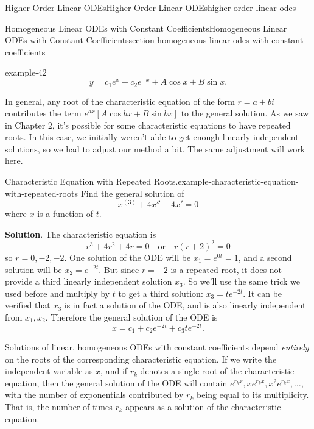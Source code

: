 \documentclass[oneside,10pt,]{book}
\numberwithin{equation}{section}
\newcommand{\brackets}[1]{\left[ #1 \right]}
\begin{document}
\begin{chapterptx}{Higher Order Linear ODEs}{}{Higher Order Linear ODEs}{}{}{higher-order-linear-odes}
\begin{sectionptx}{Homogeneous Linear ODEs with Constant Coefficients}{}{Homogeneous Linear ODEs with Constant Coefficients}{}{}{section-homogeneous-linear-odes-with-constant-coefficients}
\begin{example}{}{example-42}
\begin{equation*}
y = c_{1}e^{x}+c_{2}e^{-x}+A\cos x+B\sin x.
\end{equation*}
%
\end{example}
\hypertarget{p-273}{}%
In general, any root of the characteristic equation of the form \(r=a\pm bi\) contributes the term \(e^{ax}\brackets{A\cos bx+B\sin bx}\) to the general solution. As we saw in Chapter 2, it's possible for some characteristic equations to have repeated roots. In this case, we initially weren't able to get enough linearly independent solutions, so we had to adjust our method a bit. The same adjustment will work here.%
\begin{example}{Characteristic Equation with Repeated Roots.}{example-characteristic-equation-with-repeated-roots}%
\hypertarget{p-274}{}%
Find the general solution of%
\begin{equation*}
x^{(3)}+4x''+4x'=0
\end{equation*}
where \(x\) is a function of \(t\).%
\par\smallskip%
\noindent\textbf{Solution}.\hypertarget{solution-40}{}\quad%
\hypertarget{p-275}{}%
The characteristic equation is%
\begin{equation*}
r^{3}+4r^{2}+4r = 0\quad\text{or}\quad r(r+2)^{2}=0
\end{equation*}
so \(r=0,-2,-2\). One solution of the ODE will be \(x_{1} = e^{0t} = 1\), and a second solution will be \(x_{2} = e^{-2t}\). But since \(r=-2\) is a repeated root, it does not provide a third linearly independent solution \(x_{3}\). So we'll use the same trick we used before and multiply by \(t\) to get a third solution: \(x_{3} = te^{-2t}\). It can be verified that \(x_{3}\) is in fact a solution of the ODE, and is also linearly independent from \(x_{1},x_{2}\). Therefore the general solution of the ODE is%
\begin{equation*}
x = c_{1}+c_{2}e^{-2t}+c_{3}te^{-2t}.
\end{equation*}
%
\end{example}
\hypertarget{p-276}{}%
Solutions of linear, homogeneous ODEs with constant coefficients depend \emph{entirely} on the roots of the corresponding characteristic equation. If we write the independent variable as \(x\), and if \(r_{k}\) denotes a single root of the characteristic equation, then the general solution of the ODE will contain \(e^{r_{k}x},xe^{r_{k}x},x^{2}e^{r_{k}x},\dots\), with the number of exponentials contributed by \(r_{k}\) being equal to its multiplicity. That is, the number of times \(r_{k}\) appears as a solution of the characteristic equation.%

\end{sectionptx}
\end{chapterptx}
\end{document}
